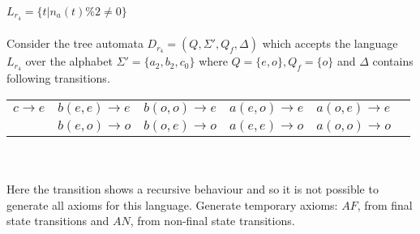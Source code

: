 \begin{example}
                     $L_{r_{4}}=\{t|n_a(t)\%2\neq 0\}$\\\\ 
Consider the tree automata $D_{r_{4}}=(Q,\Sigma ',Q_f, \Delta)$ which accepts the language $L_{r_{4}}$ over the alphabet 
$\Sigma '=\{a_2,b_2,c_0\}$ 
where $Q=\{e,o\},Q_f=\{o\}$ and $\Delta$ contains following transitions.\\

\begin{tabular}{llllll}
$c\rightarrow e$ & $ b(e,e) \rightarrow e$ & $ b(o,o) \rightarrow e$ & $a(e,o) \rightarrow e$ & 
$a(o,e) \rightarrow e$\\
&$b(e,o) \rightarrow o$ & $ b(o,e) \rightarrow o$ & $ a(e,e) \rightarrow o$ & $a(o,o) \rightarrow o$\\ 
\end{tabular}\\\\

Here the transition shows a recursive behaviour and so it is not possible to generate all axioms for this language.
Generate  temporary axioms: $AF$, from final state transitions and $AN$, from non-final state transitions.


\end{example}
